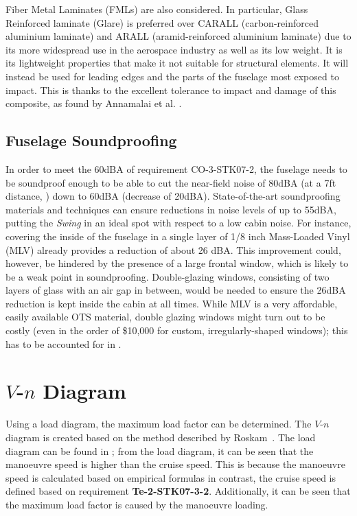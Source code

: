 Fiber Metal Laminates (FMLs) are also considered.
In particular,
Glass Reinforced laminate (Glare) is preferred over CARALL (carbon-reinforced aluminium laminate) and ARALL
(aramid-reinforced aluminium laminate)
due to its more widespread use in the aerospace industry as well as its low weight.
It is its lightweight properties that make it not suitable for structural elements.
It will instead be used for leading edges and the parts of the fuselage most exposed to impact.
This is thanks to the excellent tolerance to impact and damage of this composite, as found by Annamalai et al. \cite{ANNAMALAI20211371}.


\subsection*{Fuselage Soundproofing}
\label{subsec:fuselagesoundproofing}
In order to meet the 60dBA of requirement CO-3-STK07-2, the fuselage needs to be soundproof enough to be able to cut the near-field noise of 80dBA (at a 7ft distance, ) down to 60dBA (decrease of 20dBA).
State-of-the-art soundproofing materials and techniques can ensure reductions in noise levels of up to 55dBA, putting the \textit{Swing} in an ideal spot with respect to a low cabin noise.
For instance, covering the inside of the fuselage in a single layer of 1/8 inch Mass-Loaded Vinyl (MLV) already provides a reduction of about 26 dBA.
This improvement could, however, be hindered by the presence of a large frontal window, which is likely to be a weak point in soundproofing.
Double-glazing windows, consisting of two layers of glass with an air gap in between, would be needed to ensure the 26dBA reduction is kept inside the cabin at all times.
While MLV is a very affordable, easily available OTS material, double glazing windows might turn out to be costly (even in the order of \$10,000 for custom, irregularly-shaped windows); this has to be accounted for in .

 
\section{$V$-$n$ Diagram}
\label{sec:V-n_Diagram}

Using a load diagram, the maximum load factor can be determined.
The $V$-$n$ diagram is created based on the method described by Roskam~\cite{Roskam_Part_2}.
The load diagram can be found in ; from the load diagram, it can be seen that the manoeuvre speed is higher than the cruise speed.
This is because the manoeuvre speed is calculated based on empirical formulas in contrast, the cruise speed is defined based on requirement \textbf{Te-2-STK07-3-2}.
Additionally, it can be seen that the maximum load factor is caused by the manoeuvre loading.

